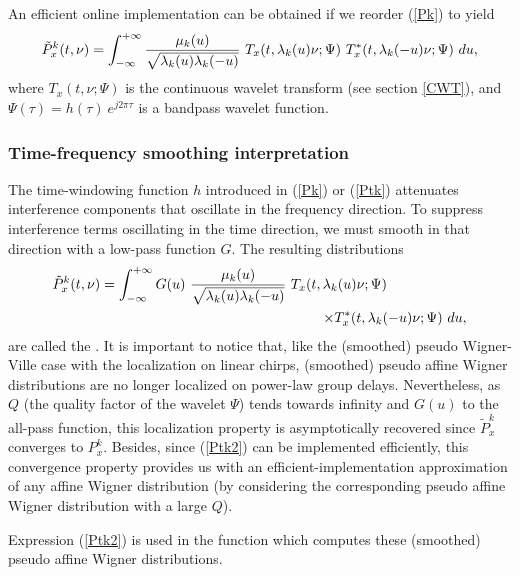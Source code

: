   An efficient online implementation can be obtained if we reorder
(\ref{Pk}) to yield
\begin{eqnarray}
\label{Ptk}
\tilde{P}_x^k(t,\nu)=\int_{-\infty}^{+\infty}
{\mu_k(u)\over\sqrt{\lambda_k(u)\lambda_k(-u)}}\  
T_x(t,\lambda_k(u)\nu;\Psi)\ T_x^*(t,\lambda_k(-u)\nu;\Psi)\ du,
\end{eqnarray}
where $T_x(t,\nu;\Psi)$ is the continuous wavelet transform (see section
\ref{CWT}), and $\Psi(\tau)=h(\tau)\ e^{j2\pi \tau}$ is a bandpass wavelet
function.

\subsubsection{Time-frequency smoothing interpretation}

  The time-windowing function $h$ introduced in (\ref{Pk}) or (\ref{Ptk})
attenuates interference components that oscillate in the frequency
direction. To suppress interference terms oscillating in the time
direction, we must smooth in that direction with a low-pass function
$G$. The resulting distributions
\begin{eqnarray}
\tilde{P}_x^k(t,\nu)=\int_{-\infty}^{+\infty} G(u)\
\frac{\mu_k(u)}{\sqrt{\lambda_k(u)\lambda_k(-u)}}\  
T_x(t,\lambda_k(u)\nu;\Psi)\hspace*{2cm}\nonumber\\
\label{Ptk2}
\times T_x^*(t,\lambda_k(-u)\nu;\Psi)\ du,
\end{eqnarray}
are called the . It is important to notice
that, like the (smoothed) pseudo Wigner-Ville case with the localization on
linear chirps, (smoothed) pseudo affine Wigner distributions are no longer
localized on power-law group delays. Nevertheless, as $Q$ (the quality
factor of the wavelet $\Psi$) tends towards infinity and $G(u)$ to the
all-pass function, this localization property is asymptotically recovered
since $\tilde{P}_x^k$ converges to $P_x^k$. Besides, since (\ref{Ptk2}) can
be implemented efficiently, this convergence property provides us with an
efficient-implementation approximation of any affine Wigner distribution
(by considering the corresponding pseudo affine Wigner distribution with a
large $Q$).

  Expression (\ref{Ptk2}) is used in the function  which computes these (smoothed) pseudo affine
Wigner distributions.


